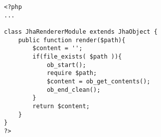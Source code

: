 \begin{lstlisting}[label=jha_renderer_module,caption=Renderizador de modulos.]
<?php
...

class JhaRendererModule extends JhaObject {
    public function render($path){
        $content = '';
        if(file_exists( $path )){
            ob_start();
            require $path;
            $content = ob_get_contents();
            ob_end_clean();
        }
        return $content;
    }
}
?>
\end{lstlisting}
